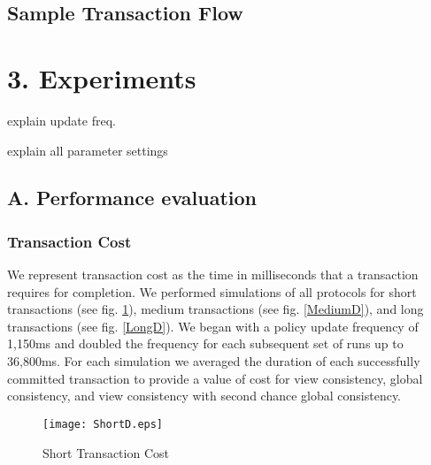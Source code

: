 \documentclass[11pt]{article}
\begin{document}
\subsection{Sample Transaction Flow}

\section{3. Experiments}
explain update freq.

explain all parameter settings
\subsection{A. Performance evaluation}
\subsubsection{Transaction Cost}
We represent transaction cost as the time in milliseconds that a transaction requires for completion. We performed simulations of all protocols for short transactions (see fig. \ref{ShortD}), medium transactions (see fig. \ref{MediumD}), and long transactions (see fig. \ref{LongD}). We began with a policy update frequency of 1,150ms and doubled the frequency for each subsequent set of runs up to 36,800ms. For each simulation we averaged the duration of each successfully committed transaction to provide a value of cost for view consistency, global consistency, and view consistency with second chance global consistency.
\begin{figure}[h]
\begin{center}
\texttt{[image: ShortD.eps]}
\caption{Short Transaction Cost}
\label{ShortD}
\end{center}
\end{figure}
\end{document}
